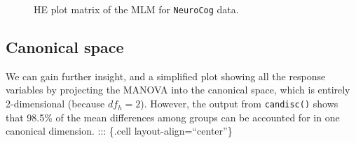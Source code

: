 \documentclass[
  letterpaper,
  10pt,
  krantz2]{krantz}
\begin{document}
\begin{figure}[H]


\caption{\label{fig-NC-HE-pairs}HE plot matrix of the MLM for
\texttt{NeuroCog} data.}

\end{figure}%

\subsection{Canonical space}\label{canonical-space}

We can gain further insight, and a simplified plot showing all the
response variables by projecting the MANOVA into the canonical space,
which is entirely 2-dimensional (because \(df_h=2\)). However, the
output from \texttt{candisc()} shows that 98.5\% of the mean differences
among groups can be accounted for in one canonical dimension. :::
\{.cell layout-align=``center''\}
\end{document}
